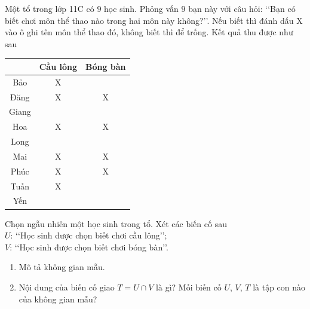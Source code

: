 \begin{bt}[Mức 1]%
	Một tổ trong lớp 11C có $9$ học sinh. Phỏng vấn $9$ bạn này với câu hỏi: \lq\lq Bạn có biết chơi môn thể thao nào trong hai môn này không?\rq\rq. Nếu biết thì đánh dấu X vào ô ghi tên môn thể thao đó, không biết thì để trống. Kết quả thu được như sau
	\begin{center}
		\begin{tabular}{|c|c|c|}
			\hline
			\diagbox{Tên học sinh}{Môn thể thao} & Cầu lông & Bóng bàn \\
			\hline
			Bảo & X & \\
			\hline
			Đăng & X & X \\
			\hline
			Giang & & \\
			\hline
			Hoa & X & X \\
			\hline
			Long & & \\
			\hline
			Mai & X & X \\
			\hline
			Phúc & X & X \\
			\hline
			Tuấn & X & \\
			\hline
			Yến & & \\
			\hline
		\end{tabular}
	\end{center}
	Chọn ngẫu nhiên một học sinh trong tổ. Xét các biến cố sau\\	
	$U$: \lq\lq Học sinh được chọn biết chơi cầu lông\rq\rq;\\
	$V$: \lq\lq Học sinh được chọn biết chơi bóng bàn\rq\rq.
	\begin{enumerate}
		\item Mô tả không gian mẫu.
		\item Nội dung của biến cố giao $T=U \cap V$ là gì? Mối biến cố $U$, $V$, $T$ là tập con nào của không gian mẫu?
	\end{enumerate}
\end{bt}


